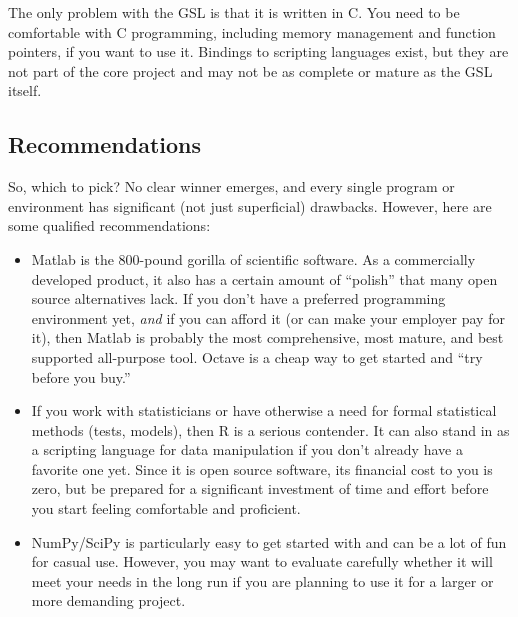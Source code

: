 The only problem with the GSL is that it is written in C.  You need to
be comfortable with C programming, including memory management and
function pointers, if you want to use it. Bindings to scripting
languages exist, but they are not part of the core project and may not
be as complete or mature as the GSL itself.


\subsection{Recommendations}

So, which to pick? No clear winner emerges, and every single program
or environment has significant (not just superficial) drawbacks.
However, here are some qualified recommendations:
\begin{itemize}
\item Matlab is the 800-pound gorilla of scientific software. As a 
  commercially developed product, it also has a certain amount of
  ``polish'' that many\vadjust{\pagebreak} open source alternatives lack.  If you don't
  have a preferred  programming environment yet, \emph{and} if you can
  afford it (or can make your employer pay for it), then Matlab is
  probably the most comprehensive, most mature, and best supported
  all-purpose tool. Octave is a cheap way to get started and ``try
  before you buy.''

\item If you work with statisticians or have otherwise a need for
  formal statistical methods (tests, models), then R is a serious 
  contender.  It can also stand in as a scripting language for data
  manipulation if you don't already have a favorite one yet. Since it
  is open source software, its financial cost to you is zero, but be
  prepared for a significant investment of time and effort before you 
  start feeling comfortable and proficient.

\item NumPy/SciPy is particularly easy to get started with and can be 
  a lot of fun for casual use. However, you may want to evaluate
  carefully whether it will meet your needs in the long run if you are
  planning to use it for a larger or more demanding project.

 

\end{itemize}
